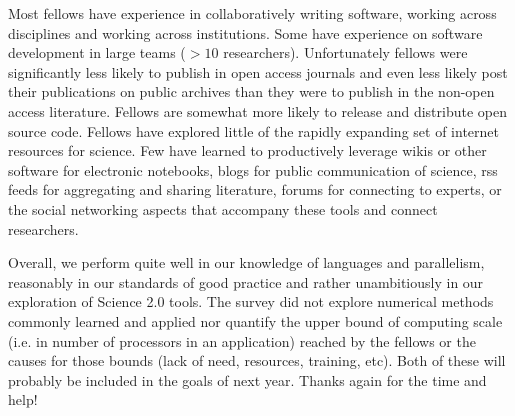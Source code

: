 \documentclass[a4paper]{article}
\begin{document}
Most fellows have experience in collaboratively writing software, working across disciplines and working across institutions.  Some have experience on software development in large teams ($>10$ researchers).  Unfortunately fellows were significantly less likely to publish in open access journals and even less likely post their publications on public archives than they were to publish in the non-open access literature.  Fellows are somewhat more likely to release and distribute open source code.  Fellows have explored little of the rapidly expanding set of internet resources for science.  Few have learned to productively leverage wikis or other software for electronic notebooks, blogs for public communication of science, rss feeds for aggregating and sharing literature, forums for connecting to experts, or the social networking aspects that accompany these tools and connect researchers.  

Overall, we perform quite well in our knowledge of languages and parallelism, reasonably in our standards of good practice and rather unambitiously in our exploration of Science 2.0 tools.  The survey did not explore numerical methods commonly learned and applied nor quantify the upper bound of computing scale (i.e. in number of processors in an application) reached by the fellows or the causes for those bounds (lack of need, resources, training, etc).  Both of these will probably be included in the goals of next year.  Thanks again for the time and help!
\end{document}
